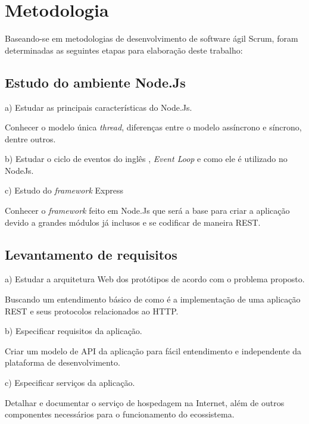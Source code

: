 \chapter{Metodologia}
\label{metodologia}

\vspace{-1.9cm}

  Baseando-se em metodologias de desenvolvimento de software ágil Scrum, foram determinadas 
  as seguintes etapas para elaboração deste trabalho:


\section{Estudo do ambiente Node.Js}
  
  \begin{compactitem}
    \item[a)] Estudar as principais características do Node.Js.
    
    Conhecer o modelo única \textit{thread}, diferenças entre o modelo assíncrono e síncrono, dentre outros.
    
    \item[b)] Estudar o ciclo de eventos do inglês , \textit{Event Loop} e como ele é utilizado no NodeJs.
    
    \item[c)] Estudo do \textit{framework} Express
    
    Conhecer o \textit{framework} feito em Node.Js que será a base para criar a 
    aplicação devido a grandes módulos já inclusos e se codificar de maneira \ac{REST}.

  \end{compactitem}
  
\section{Levantamento de requisitos}

  \begin{compactitem}
    \item[a)] Estudar a arquitetura Web dos protótipos de acordo com o problema proposto.
    
    Buscando um entendimento básico de como é a implementação de uma aplicação 
    \ac{REST} e seus protocolos relacionados ao HTTP.
    
    \item[b)] Especificar requisitos da aplicação.
    
    Criar um modelo de API da aplicação para fácil entendimento e
    independente da plataforma de desenvolvimento.
    
    \item[c)] Especificar serviços da aplicação.
    
    Detalhar e documentar o serviço de hospedagem na Internet, além de outros componentes 
    necessários para o funcionamento do ecossistema.
      
  \end{compactitem}

